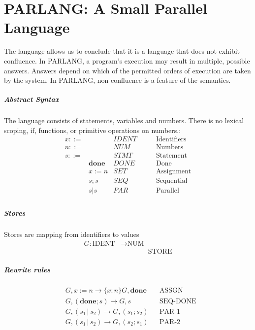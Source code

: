 \section{PARLANG: A Small Parallel Language}

The language allows us to conclude that it is a language that does not exhibit confluence.
In PARLANG, a program's execution may result in multiple, possible answers. Answers depend on which of the permitted orders of execution are taken by the system.
In PARLANG, non-confluence is a feature of the semantics.

\subparagraph{Abstract Syntax}
The language consists of statements, variables and numbers. There is no lexical scoping, if, functions, or primitive operations on numbers.:
\begin{align*}
    x ::= &               &  \scriptstyle{IDENT}  &    \qquad  \mbox{Identifiers}\\
    n ::= &               &  \scriptstyle{NUM}    &     \qquad  \mbox{Numbers}\\
    s ::= &               &  \scriptstyle{STMT}    &    \qquad \mbox{Statement}\\
          & \textbf{done}    &  \scriptstyle{DONE}    &    \qquad \mbox{Done}\\
          & x:=n          &  \scriptstyle{SET}    &    \qquad \mbox{Assignment}\\
          & s; s          &  \scriptstyle{SEQ}    &    \qquad \mbox{Sequential}\\
          & s | s         &  \scriptstyle{PAR}     &    \qquad \mbox{Parallel}\\
\end{align*}

\subparagraph{Stores} 
Stores are mapping from identifiers to values
\begin{align*}
  G : \text{IDENT} & \rightarrow \text{NUM} \\
                   & \qquad \qquad \text{STORE}
\end{align*}

\subparagraph{Rewrite rules} 
\begin{align*}
  & G, x:=n \rightarrow \{x:n\}G, \textbf{done} && \text{ASSGN} \\
  & G, (\textbf{done}; s) \rightarrow G, s && \text{SEQ-DONE} \\
  & G, (s_1 \,|\, s_2) \rightarrow G, (s_1;s_2) && \text{PAR-1} \\
  & G, (s_1 \,|\, s_2) \rightarrow G, (s_2;s_1) && \text{PAR-2}
\end{align*}

